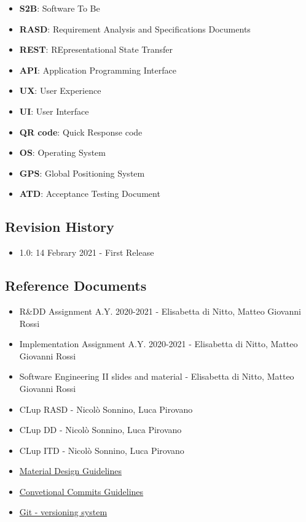 \begin{itemize}
    \item \textbf{S2B}: Software To Be
    \item \textbf{RASD}: Requirement Analysis and Specifications Documents
    \item \textbf{REST}: REpresentational State Transfer
    \item \textbf{API}: Application Programming Interface
    \item \textbf{UX}: User Experience
    \item \textbf{UI}: User Interface
    \item \textbf{QR code}: Quick Response code
    \item \textbf{OS}: Operating System
    \item \textbf{GPS}: Global Positioning System
    \item \textbf{ATD}: Acceptance Testing Document
\end{itemize}

\vfill
\pagebreak



\subsection{Revision History}

\begin{itemize}
    \item 1.0: 14 Febrary 2021 - First Release
\end{itemize}

\subsection{Reference Documents}

\begin{itemize}
    \item R\&DD Assignment A.Y. 2020-2021 - Elisabetta di Nitto, Matteo Giovanni Rossi
    \item Implementation Assignment A.Y. 2020-2021 - Elisabetta di Nitto, Matteo Giovanni Rossi
    \item Software Engineering II slides and material - Elisabetta di Nitto, Matteo Giovanni Rossi
    \item CLup RASD - Nicolò Sonnino, Luca Pirovano
    \item CLup DD - Nicolò Sonnino, Luca Pirovano
    \item CLup ITD - Nicolò Sonnino, Luca Pirovano
    \item \href{https://material.io/design}{Material Design Guidelines}
    \item \href{https://www.conventionalcommits.org/en/v1.0.0/}{Convetional Commits Guidelines}
    \item \href{https://git-scm.com/}{Git - versioning system}
\end{itemize}

